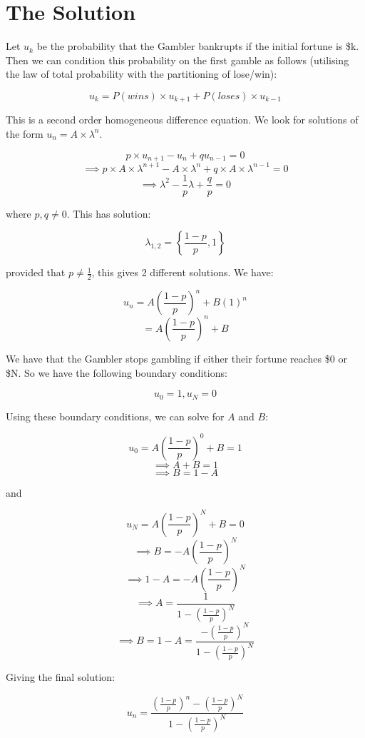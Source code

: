 \documentclass{article}
\begin{document}
\section{The Solution} %

Let $u_k$ be the probability that the Gambler bankrupts if the initial fortune is \$k. Then we can condition this probability on the first gamble as follows (utilising the law of total probability with the partitioning of lose/win):

$$u_k = P(wins) \times u_{k+1} + P(loses) \times u_{k-1}$$

This is a second order homogeneous difference equation. We look for solutions of the form $u_n = A \times \lambda^n$.

$$p \times u_{n+1} - u_n + q u_{n-1} = 0$$
$$\implies p \times A \times \lambda^{n+1} - A \times \lambda^n + q \times A \times \lambda^{n-1} = 0$$
$$\implies \lambda^{2} - \frac{1}{p} \lambda + \frac{q}{p} = 0$$

where $p, q \neq 0$. This has solution:

$$\lambda_{1,2} = \left\{\frac{1-p}{p},1\right\}$$

provided that $p \neq \frac{1}{2}$, this gives 2 different solutions. We have:

$$u_n = A \left( \frac{1-p}{p} \right)^n + B (1)^n$$
$$ = A \left( \frac{1-p}{p} \right)^n + B$$

We have that the Gambler stops gambling if either their fortune reaches \$0 or \$N. So we have the following boundary conditions:

$$u_0 = 1, u_N = 0$$

Using these boundary conditions, we can solve for $A$ and $B$:

$$u_0 = A \left( \frac{1-p}{p} \right)^0 + B = 1$$
$$\implies A+B = 1$$
$$\implies B = 1 - A$$

and

$$u_N = A \left( \frac{1-p}{p} \right)^N + B = 0$$
$$\implies B = -A \left( \frac{1-p}{p} \right)^N$$
$$\implies 1 - A = -A \left( \frac{1-p}{p} \right)^N$$
$$\implies A = \frac{1}{1 - \left( \frac{1-p}{p} \right)^N}$$
$$\implies B = 1-A = \frac{-\left( \frac{1-p}{p} \right)^N}{1 - \left( \frac{1-p}{p} \right)^N}$$

Giving the final solution:

\begin{equation}
    u_n = \frac{\left( \frac{1-p}{p} \right)^n-\left( \frac{1-p}{p} \right)^N}{1 - \left( \frac{1-p}{p} \right)^N}
\end{equation}
\end{document}
